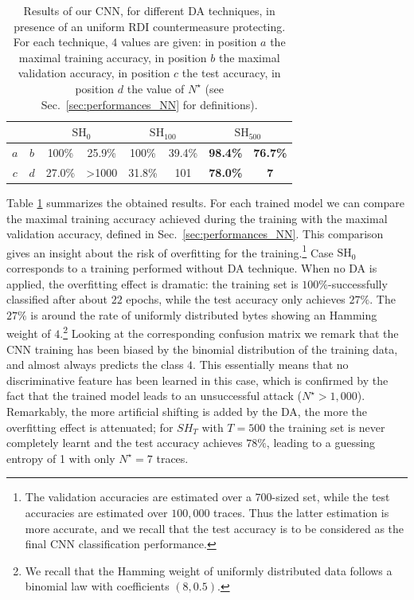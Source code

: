 \begin{table}[t]
\centering
\caption[Results of our CNN, for different DA techniques, in presence of an uniform RDI countermeasure protecting.]{Results of our CNN, for different DA techniques, in presence of an uniform RDI countermeasure protecting. For each technique, $4$ values are given: in position $a$ the maximal training accuracy, in position $b$ the maximal validation accuracy, in position $c$ the test accuracy, in position $d$ the value of $N^\star$ (see Sec.~\ref{sec:performances_NN} for definitions).}
\label{tab:res_CW_shift}
\begin{tabular}{|c|c|c|c|c|c|c|c|}
\hline
\multicolumn{2}{|c|}{} & \multicolumn{2}{c|}{$\mathrm{SH}_{0}$}                                    & \multicolumn{2}{c|}{$\mathrm{SH}_{100}$} & \multicolumn{2}{c|}{$\mathrm{SH}_{500}$} \\ \hline
$a$        & $b$       & \cellcolor[HTML]{EFEFEF}100\%  & \cellcolor[HTML]{EFEFEF}25.9\%           & 100\%               & 39.4\%             & \textbf{98.4\%}     & \textbf{76.7\%}    \\ \hline
$c$        & $d$       & \cellcolor[HTML]{EFEFEF}27.0\% & \cellcolor[HTML]{EFEFEF}\textgreater1000 & 31.8\%              & 101                & \textbf{78.0\%}     & \textbf{7}         \\ \hline
\end{tabular}
\end{table}

Table \ref{tab:res_CW_shift} summarizes the obtained results.  For each trained model we can compare the maximal training accuracy achieved during the training with the maximal validation accuracy, defined in Sec.~\ref{sec:performances_NN}.  This comparison gives an insight about the risk of overfitting for the training.\footnote{The validation accuracies are estimated over a 700-sized set, while the test accuracies are estimated over $100,000$ traces. Thus the latter estimation is more accurate, and we recall that the test accuracy is to be considered as the final CNN classification performance.} Case $\mathrm{SH}_0$ corresponds to a training performed without DA technique. When no DA is applied, the overfitting effect is dramatic: the training set is $100\%$-successfully classified after about $22$ epochs, while the test accuracy only achieves $27\%$. The $27\%$ is around the rate of uniformly distributed bytes showing an Hamming weight of $4$.\footnote{We recall that the Hamming weight of uniformly distributed data follows a binomial law with coefficients $(8,0.5)$.} Looking at the corresponding confusion matrix we remark that the CNN training has been biased by the binomial distribution of the training data, and almost always predicts the class $4$. This essentially means that no discriminative feature has been learned in this case, which is confirmed by the fact that the trained model leads to an unsuccessful attack ($N^\star>1,000$). Remarkably, the more artificial shifting is added by the DA, the more the overfitting effect is attenuated; for $SH_T$ with \eg $T=500$ the training set is never completely learnt and the test accuracy achieves $78\%$, leading to a guessing entropy of 1 with only $N^{\star}=7$ traces. \\

